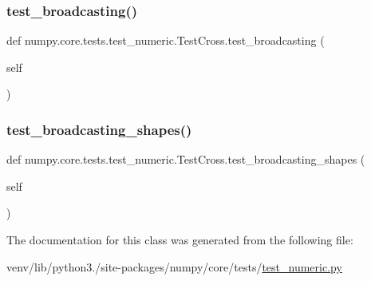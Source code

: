 \subsubsection{\texorpdfstring{test\+\_\+broadcasting()}{test\_broadcasting()}}
{\footnotesize\ttfamily def numpy.\+core.\+tests.\+test\+\_\+numeric.\+Test\+Cross.\+test\+\_\+broadcasting (\begin{DoxyParamCaption}\item[{}]{self }\end{DoxyParamCaption})}

\mbox{\label{classnumpy_1_1core_1_1tests_1_1test__numeric_1_1TestCross_a080067ec06c94133a99e5b40591dc66a}} 
\subsubsection{\texorpdfstring{test\+\_\+broadcasting\+\_\+shapes()}{test\_broadcasting\_shapes()}}
{\footnotesize\ttfamily def numpy.\+core.\+tests.\+test\+\_\+numeric.\+Test\+Cross.\+test\+\_\+broadcasting\+\_\+shapes (\begin{DoxyParamCaption}\item[{}]{self }\end{DoxyParamCaption})}



The documentation for this class was generated from the following file\+:\begin{DoxyCompactItemize}
\item 
venv/lib/python3./site-\/packages/numpy/core/tests/\hyperlink{core_2tests_2test__numeric_8py}{test\+\_\+numeric.\+py}\end{DoxyCompactItemize}
